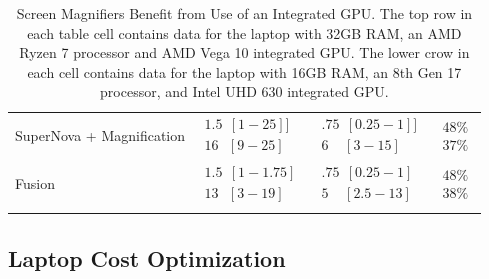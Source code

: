 \begin{longtable}[]{@{}
>{\raggedright\arraybackslash}m{}
>{\raggedright\arraybackslash}m{}
>{\raggedright\arraybackslash}m{}
>{\raggedright\arraybackslash}m{}@{}
	}
	SuperNova + Magnification & $\begin{array}{l}1.5~~[1-25] ]\\16~~~[9-25]\end{array}$  & $\begin{array}{l}.75~~[0.25-1] ]\\6~~~~~[3-15]\end{array}$ & $\begin{array}{l} 48\%\\ 37\%\end{array}$ \\\cdashline{2-4}
	Fusion   & $\begin{array}{l}1.5~~[1-1.75]\\13~~~[3-19]\end{array}$  & $\begin{array}{l}.75~~[0.25-1]\\5~~~~~[2.5-13]\end{array}$ & $\begin{array}{l} 48\%\\ 38\%\end{array}$ \\[1.0em]\hline
	\caption[Screen Magnifiers Benefit from Integrated GPU]{Screen Magnifiers Benefit from Use of an Integrated GPU. The top row in each table cell contains data for the laptop with 32GB RAM, an AMD Ryzen 7 processor and AMD Vega 10 integrated GPU. The lower crow in each cell contains data for the laptop with 16GB RAM, an 8th Gen 17 processor, and Intel UHD 630 integrated GPU.} \label{tab:table51}
\end{longtable}



\pagebreak	\hypertarget{optimizing-cost-with-performance}{}\subsection{Laptop Cost Optimization}\label{optimizing-cost-with-performance}

